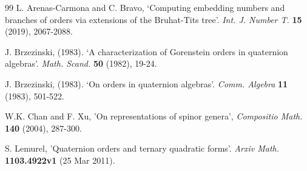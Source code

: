 \documentclass{amsart}
\theoremstyle{definition}
\begin{document}
\begin{thebibliography}{99}
{\sc L. Arenas-Carmona} and {\sc C. Bravo},
`Computing embedding numbers and branches of 
orders via extensions of the Bruhat-Tits tree'. 
 {\em Int. J. Number T.}  
{\bf 15} (2019), 2067-2088. 



{\sc J. Brzezinski},  (1983). `A characterization of Gorenstein orders in quaternion algebras'. {\em Math. Scand.} \textbf{50} (1982), 19-24.

{\sc J. Brzezinski},  (1983). `On orders in quaternion algebras'. {\em Comm. Algebra} \textbf{11} (1983), 501-522.


{\sc W.K. Chan} and {\sc F. Xu}, 'On representations of
spinor genera',  {\em  Compositio Math.} \textbf{140}
(2004), 287-300.


{\sc  S. Lemurel},
 'Quaternion orders and ternary quadratic forms'.
 {\em   Arxiv Math.} \textbf{1103.4922v1} (25 Mar 2011).






\end{thebibliography}
\end{document}
